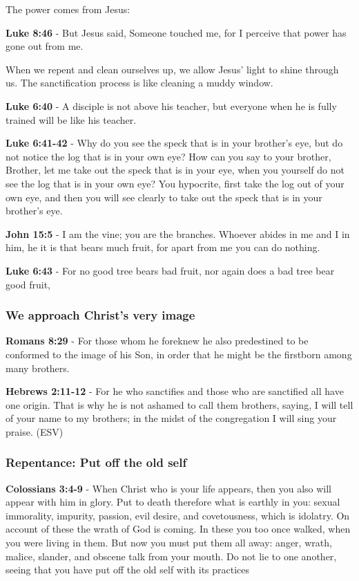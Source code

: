 \documentclass[11pt]{article}
\begin{document}
The power comes from Jesus:

\textbf{Luke 8:46} - But Jesus said, Someone touched me, for I perceive that power has gone out from me.

When we repent and clean ourselves up, we allow Jesus' light to shine through us. The sanctification process is like cleaning a muddy window.

\textbf{Luke 6:40} - A disciple is not above his teacher, but everyone when he is fully trained will be like his teacher.

\textbf{Luke 6:41-42} - Why do you see the speck that is in your brother's eye, but do not notice the log that is in your own eye? How can you say to your brother, Brother, let me take out the speck that is in your eye, when you yourself do not see the log that is in your own eye? You hypocrite, first take the log out of your own eye, and then you will see clearly to take out the speck that is in your brother's eye.

\textbf{John 15:5} - I am the vine; you are the branches. Whoever abides in me and I in him, he it is that bears much fruit, for apart from me you can do nothing.

\textbf{Luke 6:43} - For no good tree bears bad fruit, nor again does a bad tree bear good fruit,

\subsubsection{We approach Christ's very image}
\label{sec:org1ac60f9}
\textbf{Romans 8:29} - For those whom he foreknew he also predestined to be conformed to the image of his Son, in order that he might be the firstborn among many brothers.

\textbf{Hebrews 2:11-12} -  For he who sanctifies and those who are sanctified all have one origin.  That is why he is not ashamed to call them brothers, saying, I will tell of your name to my brothers; in the midst of the congregation I will sing your praise.  (ESV)

\subsubsection{Repentance: Put off the old self}
\label{sec:orgbc74fa9}
\textbf{Colossians 3:4-9} - When Christ who is your life appears, then you also will appear with him in glory. Put to death therefore what is earthly in you: sexual immorality, impurity, passion, evil desire, and covetousness, which is idolatry. On account of these the wrath of God is coming. In these you too once walked, when you were living in them. But now you must put them all away: anger, wrath, malice, slander, and obscene talk from your mouth. Do not lie to one another, seeing that you have put off the old self with its practices
\end{document}
